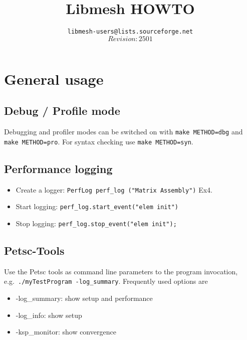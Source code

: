 \documentclass{article}
\newcommand{\exmp}[1]{\textsf{Ex#1}}
\newcommand{\code}[1]{\texttt{#1}}
\begin{document}
\lstset{language=C++}


\title{Libmesh HOWTO}
\author{\texttt{libmesh-users@lists.sourceforge.net} \\
        $$Revision: 2501 $$}
\maketitle

\section{General usage}
\label{sec:usage-tips}

\subsection{Debug / Profile mode}
\label{sec:debug-profile}

Debugging and profiler modes can be switched on with \code{make METHOD=dbg}
and \code{make METHOD=pro}.  For syntax checking use \code{make METHOD=syn}.

\subsection{Performance logging}
\label{sec:performance-logging}

\begin{itemize}
\item Create a logger: \code{PerfLog perf\_log ("Matrix Assembly")} \exmp{4}.
\item Start logging: \code{perf\_log.start\_event("elem init")}
\item Stop logging: \code{perf\_log.stop\_event("elem init");}
\end{itemize}

\subsection{Petsc-Tools}
\label{sec:petsc-tools}

Use the Petsc tools as command line parameters to the program invocation,
e.g.~\code{./myTestProgram -log\_summary}. Frequently used options are

\begin{itemize}
\item -log\_summary: show setup and performance
\item -log\_info: show setup
\item -ksp\_monitor: show convergence
\end{itemize}
\end{document}
